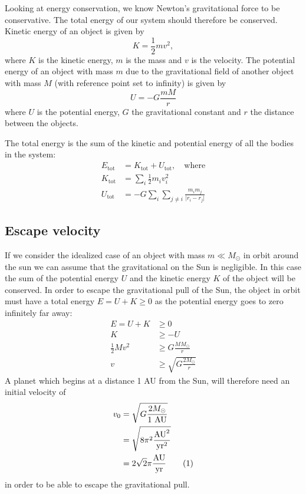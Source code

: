 \documentclass[reprint, english,notitlepage,nofootinbib]{revtex4-1}  %
\newcommand\numberthis{\addtocounter{equation}{1}\tag{\theequation}}
\begin{document}
Looking at energy conservation, we know Newton's gravitational force to be conservative. The total energy of our system should therefore be conserved. Kinetic energy of an object is given by
\begin{equation}
  \label{eq:kinetic_energy}
  K = \frac{1}{2}mv^2,
\end{equation}
where $K$ is the kinetic energy, $m$ is the mass and $v$ is the velocity. The potential energy of an object with mass $m$ due to the gravitational field of another object with mass $M$ (with reference point set to infinity) is given by
\begin{equation}
  \label{eq:potential_energy}
  U = - G \frac{m M}{r}
\end{equation}
where $U$ is the potential energy, $G$ the gravitational constant and $r$ the distance between the objects.

The total energy is the sum of the kinetic and potential energy of all the bodies in the system:
\begin{align*}
  E_{\text{tot}} &= K_{\text{tot}} + U_{\text{tot}}, \quad \text{where} \\
  K_{\text{tot}} &= \sum_i \frac{1}{2} m_i v_i^2 \\
  U_{\text{tot}} &= - G \sum_i \sum_{j \neq i} \frac{m_i m_j}{\lvert r_i - r_j \rvert}
\end{align*}


\subsection{Escape velocity}

If we consider the idealized case of an object with mass $m \ll M_\odot$ in orbit around the sun we can assume that the gravitational on the Sun is negligible. In this case the sum of the potential energy $U$ and the kinetic energy $K$ of the object will be conserved. In order to escape the gravitational pull of the Sun, the object in orbit must have a total energy $E = U + K \ge 0$ as the potential energy goes to zero infinitely far away:
\begin{align*}
  E = U + K &\ge 0 \\
  K &\ge - U \\
  \frac{1}{2} M v^2 &\ge G \frac{M M_\odot}{r} \\
  v &\ge \sqrt{G \frac{2 M_\odot}{r}}
\end{align*}
A planet which begins at a distance 1 AU from the Sun, will therefore need an initial velocity of
\begin{align*}
  v_0 &= \sqrt{G \frac{2 M_\odot}{1 \text{ AU}}} \\
  &= \sqrt{8 \pi^2 \frac{\text{AU}^2}{\text{yr}^2}} \\
  &= 2 \sqrt 2 \pi \frac{\text{AU}}{\text{yr}} \numberthis \label{eq:escape_velocity}
\end{align*}
in order to be able to escape the gravitational pull.
\end{document}
